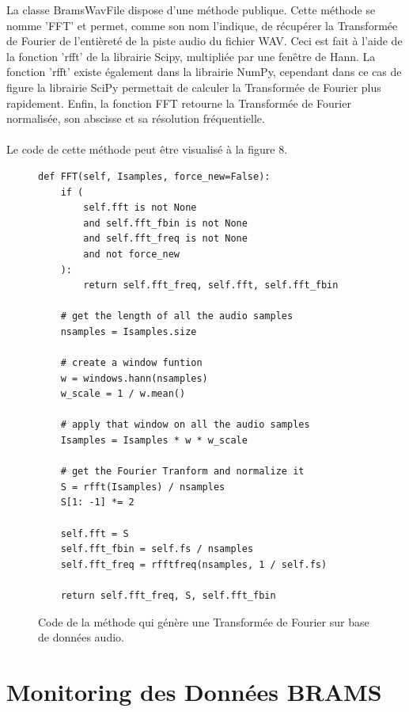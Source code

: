 \documentclass[11pt]{article}
\begin{document}
La classe BramsWavFile dispose d'une méthode publique.
Cette méthode se nomme 'FFT' et permet, comme son nom l'indique, de récupérer la Transformée de Fourier de l'entièreté de la piste audio du fichier WAV.
Ceci est fait à l'aide de la fonction 'rfft' de la librairie Scipy, multipliée par une fenêtre de Hann.
La fonction 'rfft' existe également dans la librairie NumPy, cependant dans ce cas de figure la librairie SciPy permettait de calculer la Transformée de Fourier plus rapidement.
Enfin, la fonction FFT retourne la Transformée de Fourier normalisée, son abscisse et sa résolution fréquentielle.\\
\\
Le code de cette méthode peut être visualisé à la figure 8.

\begin{figure}
    \begin{lstlisting}[style=CStyle]
def FFT(self, Isamples, force_new=False):
    if (
        self.fft is not None
        and self.fft_fbin is not None
        and self.fft_freq is not None
        and not force_new
    ):
        return self.fft_freq, self.fft, self.fft_fbin

    # get the length of all the audio samples
    nsamples = Isamples.size

    # create a window funtion
    w = windows.hann(nsamples)
    w_scale = 1 / w.mean()

    # apply that window on all the audio samples
    Isamples = Isamples * w * w_scale

    # get the Fourier Tranform and normalize it
    S = rfft(Isamples) / nsamples
    S[1: -1] *= 2

    self.fft = S
    self.fft_fbin = self.fs / nsamples
    self.fft_freq = rfftfreq(nsamples, 1 / self.fs)

    return self.fft_freq, S, self.fft_fbin
    \end{lstlisting}
    \caption{Code de la méthode qui génère une Transformée de Fourier sur base de données audio.}
\end{figure}

\newpage

\section{Monitoring des Données BRAMS}
\end{document}
